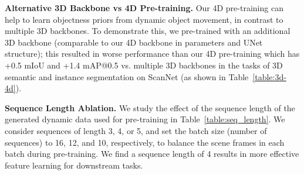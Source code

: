 \documentclass[runningheads]{llncs}
\begin{document}
\begin{table}[tb]
\centering
\caption{Effect of sequence length of pre-training dynamic data on ScanNet semantic segmentation fine-tuning. A sequence length of 4 helps 4DContrast get higher semantic segmentation mIoU.}
\vspace{-0.2cm}
    \label{table:seq_length}
\end{table}

\noindent \textbf{Alternative 3D Backbone vs 4D Pre-training.}
Our 4D pre-training can help to learn objectness priors from dynamic object movement, in contrast to multiple 3D backbones.
To demonstrate this, we pre-trained with an additional 3D backbone (comparable to our 4D backbone in parameters and UNet structure); this resulted in worse performance than our 4D pre-training which has +0.5 mIoU and +1.4 mAP@0.5 vs. multiple 3D backbones in the tasks of 3D semantic and instance segmentation on ScanNet (as shown in Table~\ref{table:3d-4d}).

\noindent\textbf{Sequence Length Ablation.}
We study the effect of the sequence length of the generated dynamic data used for pre-training in Table~\ref{table:seq_length}.
We consider sequences of length 3, 4, or 5, and set the batch size (number of sequences) to 16, 12, and 10, respectively, to balance the scene frames in each batch during pre-training. 
We find a sequence length of 4 results in more effective feature learning for downstream tasks.

\begin{table}[tbh]
\centering
\caption{Comparisons of SimCLR and SimSiam as our contrastive learning framework on ScanNet semantic segmentation fine-tuning.}
\vspace{-0.2cm}
        \label{table:cl_frameworks}
\end{table}
\end{document}
